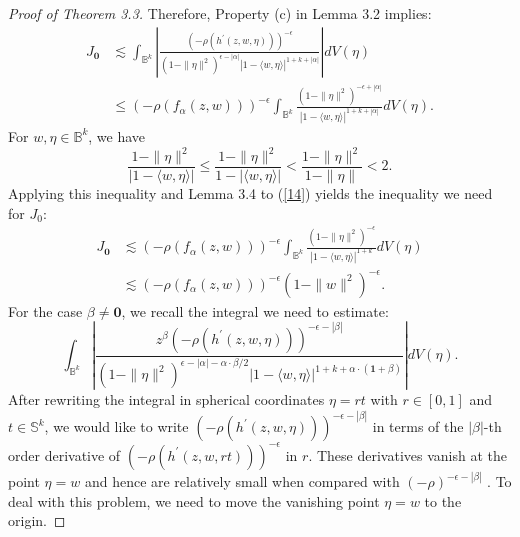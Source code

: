 \documentclass[reqno,12pt]{amsart}
\numberwithin{equation}{section}
\begin{document}
\begin{proof}[Proof of Theorem 3.3]
			Therefore, Property {(c)} in Lemma {3.2} implies:
			\begin{align}\label{14}
			J_\mathbf 0&\lesssim \int_{\mathbb B^k}\left|\frac{\left(-\rho\left(h^{\prime}(z,w,\eta) \right)\right)^{-\epsilon}}{(1-\|\eta\|^2)^{\epsilon-|\alpha|}|1- \langle w,\eta\rangle|^{1+k+|\alpha|}}\right|dV(\eta)\nonumber\\&\leq\left(-\rho(f_{\alpha}(z,w))\right)^{-\epsilon}\int_{\mathbb B^k}\frac{(1-\|\eta\|^2)^{-\epsilon+|\alpha|}}{|1- \langle w,\eta\rangle|^{1+k+|\alpha|}}dV(\eta).
			\end{align}
			For $w,\eta\in\mathbb B^k$, we have 
			\begin{equation}\label{*}
			\frac{1-\|\eta\|^2}{|1-\langle w,{\eta}\rangle |}\leq\frac{1-\|\eta\|^2}{1-|\langle w,{\eta}\rangle |}< \frac{1-\|\eta\|^2}{1-\|{\eta}\|}<2.
			\end{equation} 
			Applying this inequality and Lemma 3.4 to (\ref{14}) yields the inequality we need for $J_0$:
			\begin{align}\label{15}
			J_\mathbf 0&\lesssim \left(-\rho(f_{\alpha}(z,w))\right)^{-\epsilon}\int_{\mathbb B^k}\frac{(1-\|\eta\|^2)^{-\epsilon}}{|1- \langle w,\eta\rangle|^{1+k}}dV(\eta)\nonumber
			\\&\lesssim \left(-\rho(f_{\alpha}(z,w))\right)^{-\epsilon}(1-\|w\|^2)^{-\epsilon}.
			\end{align}
			{For the case $\beta\neq \mathbf 0$, we recall the integral we need to estimate:}
			\begin{equation}\label{16}
			\int_{\mathbb B^k}\left|\frac{z^{\beta}\left(-\rho\left(h^{\prime}(z,w,\eta) \right)\right)^{-\epsilon-|\beta|}}{(1-\|\eta\|^2)^{\epsilon-|\alpha|-\alpha\cdot\beta/2}|1- \langle w,\eta\rangle |^{1+k+\alpha\cdot(\mathbf 1+\beta)}}\right|dV(\eta).\end{equation}
			{After rewriting} the integral in spherical coordinates $\eta=rt$ with $r\in[0,1]$ and $t\in \mathbb S^k$, we would like to {write $\left(-\rho\left(h^{\prime}(z,w,\eta) \right)\right)^{-\epsilon-|\beta|}$ in terms of the $|\beta|$-th order derivative of $\left(-\rho\left(h^{\prime}(z,w,rt) \right)\right)^{-\epsilon}$ in $r$.}
		These derivatives vanish at the point $\eta=w$ and hence  are relatively small when compared with $(-\rho)^{-\epsilon-|\beta|}$ . To deal with this problem, we need to move the vanishing point $\eta=w$ to the origin.
		

\end{proof}
\end{document}
